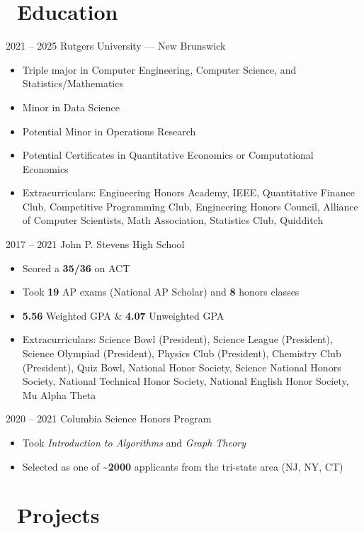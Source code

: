 \documentclass[12]{article}
\begin{document}
\section{\faGraduationCap\ Education}
\entry
{2021 -- 2025}
{Rutgers University --- New Brunswick}
{
  \begin{itemize}
  \item Triple major in Computer Engineering, Computer Science, and Statistics/Mathematics
  \item Minor in Data Science
  \item Potential Minor in Operations Research
  \item Potential Certificates in Quantitative Economics or Computational Economics
  \item Extracurriculars: Engineering Honors Academy, IEEE, Quantitative Finance Club, Competitive Programming Club, Engineering Honors Council, Alliance of Computer Scientists, Math Association, Statistics Club, Quidditch
  \end{itemize}
}

\entry
{2017 -- 2021}
{John P. Stevens High School}
{
  \begin{itemize}
  \item Scored a \textbf{35/36} on ACT
  \item Took \textbf{19} AP exams (National AP Scholar) and \textbf{8} honors classes
  \item \textbf{5.56} Weighted GPA \& \textbf{4.07} Unweighted GPA
  \item Extracurriculars: Science Bowl (President), Science League (President), Science Olympiad (President), Physics Club (President), Chemistry Club (President), Quiz Bowl, National Honor Society, Science National Honors Society, National Technical Honor Society, National English Honor Society, Mu Alpha Theta
  \end{itemize}
}

\entry
{2020 -- 2021}
{Columbia Science Honors Program}
{
  \begin{itemize}
  \item Took \emph{Introduction to Algorithms} and \emph{Graph Theory}
  \item Selected as one of \textbf{\textasciitilde 2000} applicants from the tri-state area (NJ, NY, CT)
  \end{itemize}
}



\section{\faSitemap\ Projects}
\end{document}
